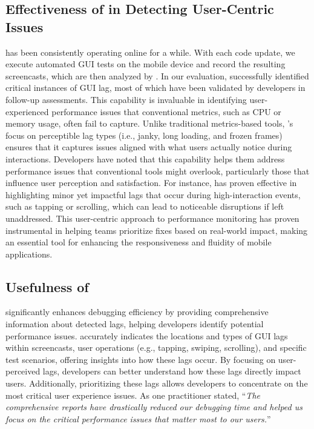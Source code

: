 \subsection{Effectiveness of \tool in Detecting User-Centric Issues}
\tool has been consistently operating online for a while. With each code update, we execute automated GUI tests on the mobile device and record the resulting screencasts, which are then analyzed by \tool. In our evaluation, \tool successfully identified critical instances of GUI lag, most of which have been validated by developers in follow-up assessments. This capability is invaluable in identifying user-experienced performance issues that conventional metrics, such as CPU or memory usage, often fail to capture. 
Unlike traditional metrics-based tools, \tool's focus on perceptible lag types (i.e., janky, long loading, and frozen frames) ensures that it captures issues aligned with what users actually notice during interactions. Developers have noted that this capability helps them address performance issues that conventional tools might overlook, particularly those that influence user perception and satisfaction. For instance, \tool has proven effective in highlighting minor yet impactful lags that occur during high-interaction events, such as tapping or scrolling, which can lead to noticeable disruptions if left unaddressed. This user-centric approach to performance monitoring has proven instrumental in helping teams prioritize fixes based on real-world impact, making \tool an essential tool for enhancing the responsiveness and fluidity of mobile applications.


\subsection{Usefulness of \tool}
\tool significantly enhances debugging efficiency by providing comprehensive information about detected lags, helping developers identify potential performance issues. \tool accurately indicates the locations and types of GUI lags within screencasts, user operations (e.g., tapping, swiping, scrolling), and specific test scenarios, offering insights into how these lags occur. By focusing on user-perceived lags, developers can better understand how these lags directly impact users. Additionally, prioritizing these lags allows developers to concentrate on the most critical user experience issues. 
As one practitioner stated, ``\textit{The comprehensive reports have drastically reduced our debugging time and helped us focus on the critical performance issues that matter most to our users.}''



